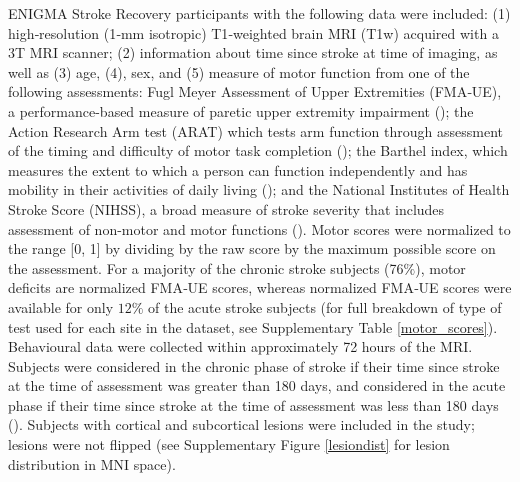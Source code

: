 \documentclass[10pt]{article}
\begin{document}
ENIGMA Stroke Recovery participants with the following data were included: (1) high‐resolution (1‐mm isotropic) T1‐weighted brain MRI (T1w) acquired with a 3T MRI scanner; (2) information about time since stroke at time of imaging, as well as (3) age, (4), sex, and (5) measure of motor function from one of the following assessments: Fugl Meyer Assessment of Upper Extremities (FMA‐UE), a performance-based measure of paretic upper extremity impairment (\cite{Gladstone2002-fw}); the Action Research Arm test (ARAT) which tests arm function through assessment of the timing and difficulty of motor task completion (\cite{Yozbatiran2008-xv}); the Barthel index, which measures the extent to which a person can function independently and has mobility in their activities of daily living (\cite{Sulter1999-rr}); and the National Institutes of Health Stroke Score (NIHSS), a broad measure of stroke severity that includes assessment of non-motor and motor functions (\cite{Lyden2017-za}). Motor scores were normalized to the range [0, 1] by dividing by the raw score by the maximum possible score on the assessment. For a majority of the chronic stroke subjects (76$\%$), motor deficits are normalized FMA‐UE scores, whereas normalized FMA‐UE scores were available for only $12\%$ of the acute stroke subjects (for full breakdown of type of test used for each site in the dataset, see Supplementary Table \ref{motor_scores}). Behavioural data were collected within approximately 72 hours of the MRI. Subjects were considered in the chronic phase of stroke if their time since stroke at the time of assessment was greater than 180 days, and considered in the acute phase if their time since stroke at the time of assessment was less than 180 days (\cite{Bernhardt2017-av}). Subjects with cortical and subcortical lesions were included in the study; lesions were not flipped (see Supplementary Figure \ref{lesiondist} for lesion distribution in MNI space). 
\end{document}
